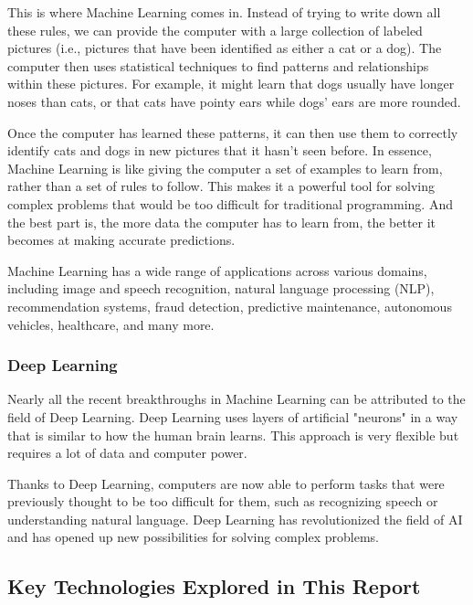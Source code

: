 \documentclass{article}
\begin{document}
This is where Machine Learning comes in. Instead of trying to write down
all these rules, we can provide the computer with a large collection of
labeled pictures (i.e., pictures that have been identified as either a cat
or a dog). The computer then uses statistical techniques to find patterns
and relationships within these pictures. For example, it might learn that
dogs usually have longer noses than cats, or that cats have pointy ears
while dogs' ears are more rounded.

Once the computer has learned these patterns, it can then use them
to correctly identify cats and dogs in new pictures that it hasn't
seen before. In essence, Machine Learning is like giving the computer
a set of examples to learn from, rather than a set of rules to follow.
This makes it a powerful tool for solving complex problems that would
be too difficult for traditional programming. And the best part is,
the more data the computer has to learn from, the better it becomes
at making accurate predictions.

Machine Learning has a wide range of applications across various
domains, including image and speech recognition, natural language
processing (NLP), recommendation systems, fraud detection, predictive
maintenance, autonomous vehicles, healthcare, and many more.

\subsubsection{Deep Learning}

Nearly all the recent breakthroughs in Machine Learning can be attributed
to the field of Deep Learning. Deep Learning uses layers of artificial
"neurons" in a way that is similar to how the human brain learns.
This approach is very flexible but requires a lot of data and computer
power.

Thanks to Deep Learning, computers are now able to perform tasks that
were previously thought to be too difficult for them, such as recognizing
speech or understanding natural language. Deep Learning has revolutionized
the field of AI and has opened up new possibilities for solving complex
problems.


\subsection{Key Technologies Explored in This Report}
\end{document}
